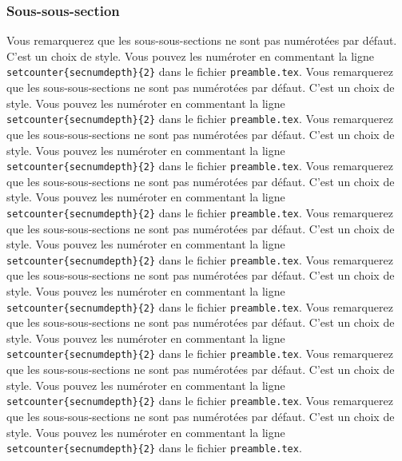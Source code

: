 \subsubsection{Sous-sous-section}
Vous remarquerez que les sous-sous-sections ne sont pas numérotées par défaut. C'est un choix de style. Vous pouvez les numéroter en commentant la ligne \texttt{\\setcounter\{secnumdepth\}\{2\}} dans le fichier \texttt{preamble.tex}.
Vous remarquerez que les sous-sous-sections ne sont pas numérotées par défaut. C'est un choix de style. Vous pouvez les numéroter en commentant la ligne \texttt{\\setcounter\{secnumdepth\}\{2\}} dans le fichier \texttt{preamble.tex}.
Vous remarquerez que les sous-sous-sections ne sont pas numérotées par défaut. C'est un choix de style. Vous pouvez les numéroter en commentant la ligne \texttt{\\setcounter\{secnumdepth\}\{2\}} dans le fichier \texttt{preamble.tex}.
Vous remarquerez que les sous-sous-sections ne sont pas numérotées par défaut. C'est un choix de style. Vous pouvez les numéroter en commentant la ligne \texttt{\\setcounter\{secnumdepth\}\{2\}} dans le fichier \texttt{preamble.tex}.
Vous remarquerez que les sous-sous-sections ne sont pas numérotées par défaut. C'est un choix de style. Vous pouvez les numéroter en commentant la ligne \texttt{\\setcounter\{secnumdepth\}\{2\}} dans le fichier \texttt{preamble.tex}.
Vous remarquerez que les sous-sous-sections ne sont pas numérotées par défaut. C'est un choix de style. Vous pouvez les numéroter en commentant la ligne \texttt{\\setcounter\{secnumdepth\}\{2\}} dans le fichier \texttt{preamble.tex}.
Vous remarquerez que les sous-sous-sections ne sont pas numérotées par défaut. C'est un choix de style. Vous pouvez les numéroter en commentant la ligne \texttt{\\setcounter\{secnumdepth\}\{2\}} dans le fichier \texttt{preamble.tex}.
Vous remarquerez que les sous-sous-sections ne sont pas numérotées par défaut. C'est un choix de style. Vous pouvez les numéroter en commentant la ligne \texttt{\\setcounter\{secnumdepth\}\{2\}} dans le fichier \texttt{preamble.tex}.
Vous remarquerez que les sous-sous-sections ne sont pas numérotées par défaut. C'est un choix de style. Vous pouvez les numéroter en commentant la ligne \texttt{\\setcounter\{secnumdepth\}\{2\}} dans le fichier \texttt{preamble.tex}.

